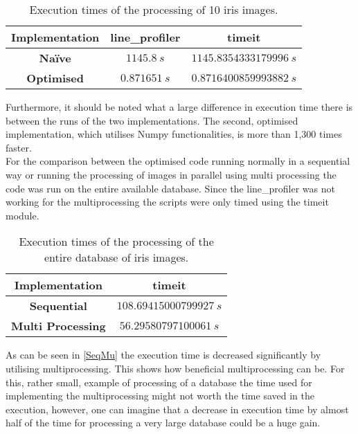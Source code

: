 \begin{table}[H]
\centering
\begin{tabular}{ |c|c|c| }
\hline
\textbf{Implementation}&\textbf{line_profiler}&\textbf{timeit} \\
\hline
\textbf{Na\"ive}&$1145.8~s$&$1145.8354333179996~s$\\
\hline
\textbf{Optimised}&$0.871651~s$&$0.8716400859993882~s$\\
\hline
\end{tabular}
\label{NaOPT}
\caption{Execution times of the processing of 10 iris images. }
\end{table}
\noindent
Furthermore, it should be noted what a large difference in execution time there is between the runs of the two implementations. The second, optimised implementation, which utilises Numpy functionalities, is more than 1,300 times faster. \\
For the comparison between the optimised code running normally in a sequential way or running the processing of images in parallel using multi processing the code was run on the entire available database. Since the line_profiler was not working for the multiprocessing the scripts were only timed using the timeit module. 
\begin{table}[H]
\centering
\begin{tabular}{ |c|c| }
\hline
\textbf{Implementation}&\textbf{timeit} \\
\hline
\textbf{Sequential}&$108.69415000799927~s$\\
\hline
\textbf{Multi Processing}&$56.29580797100061~s$\\
\hline
\end{tabular}
\label{SeqMu}
\caption{Execution times of the processing of the entire database of iris images. }
\end{table}
\noindent
As can be seen in \autoref{SeqMu} the execution time is decreased significantly by utilising multiprocessing. This shows how beneficial multiprocessing can be. For this, rather small, example of processing of a database  the time used for implementing the multiprocessing might not worth the time saved in the execution, however, one can imagine that a decrease in execution time by almost half of the time for processing a very large database could be a huge gain. 
     